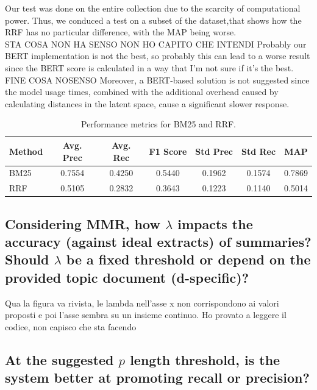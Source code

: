 Our test was done on the entire collection due to the scarcity of computational
power. Thus, we conduced a test on a subset of the dataset,that shows how the
RRF has no particular difference, with the MAP being worse. \\ STA COSA NON HA
SENSO NON HO CAPITO CHE INTENDI Probably our BERT implementation is not the
best, so probably this can lead to a worse result since the BERT score is
calculated in a way that I'm not sure if it's the best. \\FINE COSA NOSENSO
Moreover, a BERT-based solution is not suggested since the model usage times,
combined with the additional overhead caused by calculating distances in the
latent space, cause a significant slower response.

\begin{center}
    \begin{table}[H]
        \centering
        \begin{tabular}{|l|c|c|c|c|c|c|}
            \hline
            Method & Avg. Prec & Avg. Rec & F1 Score & Std Prec & Std Rec & MAP    \\
            \hline
            BM25   & 0.7554    & 0.4250   & 0.5440   & 0.1962   & 0.1574  & 0.7869 \\
            \hline
            RRF    & 0.5105    & 0.2832   & 0.3643   & 0.1223   & 0.1140  & 0.5014 \\
            \hline
        \end{tabular}
        \caption{Performance metrics for BM25 and RRF.}
        \label{tab:bm25_rrf}
    \end{table}
\end{center}

\subsection{Considering MMR, how $\lambda$ impacts the accuracy (against ideal extracts) of summaries? Should $\lambda$ be a fixed threshold or depend on the provided topic document (d-specific)?}
Qua la figura va rivista, le lambda nell'asse x non corrispondono ai valori
proposti e poi l'asse sembra su un insieme continuo. Ho provato a leggere il
codice, non capisco che sta facendo
\subsection{At the suggested $p$ length threshold, is the system better at promoting recall or precision?}

